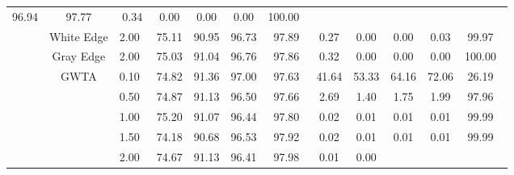 \begin{table}[htbp]
{\begin{tabular}{cc|c|ccccccccc}
  \multicolumn{1}{c|}{96.94} &
  \multicolumn{1}{c|}{97.77} &
  \multicolumn{1}{c|}{0.34} &
  \multicolumn{1}{c|}{0.00} &
  \multicolumn{1}{c|}{0.00} &
  \multicolumn{1}{c|}{0.00} &
  100.00\ \\ \cline{2-12} 
\multicolumn{1}{c|}{} &
  White Edge &
  2.00\ &
  \multicolumn{1}{c|}{75.11} &
  \multicolumn{1}{c|}{90.95} &
  \multicolumn{1}{c|}{96.73} &
  \multicolumn{1}{c|}{97.89} &
  \multicolumn{1}{c|}{0.27} &
  \multicolumn{1}{c|}{0.00} &
  \multicolumn{1}{c|}{0.00} &
  \multicolumn{1}{c|}{0.03} &
  99.97\ \\ \cline{2-12} 
\multicolumn{1}{c|}{} &
  Gray Edge &
  2.00\ &
  \multicolumn{1}{c|}{75.03} &
  \multicolumn{1}{c|}{91.04} &
  \multicolumn{1}{c|}{96.76} &
  \multicolumn{1}{c|}{97.86} &
  \multicolumn{1}{c|}{0.32} &
  \multicolumn{1}{c|}{0.00} &
  \multicolumn{1}{c|}{0.00} &
  \multicolumn{1}{c|}{0.00} &
  100.00\ \\ \cline{2-12} 
\multicolumn{1}{c|}{} &
  \multirow{9}{*}{GWTA}&
  0.10\ &
  \multicolumn{1}{c|}{74.82} &
  \multicolumn{1}{c|}{91.36} &
  \multicolumn{1}{c|}{97.00} &
  \multicolumn{1}{c|}{97.63} &
  \multicolumn{1}{c|}{41.64} &
  \multicolumn{1}{c|}{53.33} &
  \multicolumn{1}{c|}{64.16} &
  \multicolumn{1}{c|}{72.06} &
  26.19\ \\ \cline{3-12} 
\multicolumn{1}{c|}{} &
   &
  0.50\ &
  \multicolumn{1}{c|}{74.87} &
  \multicolumn{1}{c|}{91.13} &
  \multicolumn{1}{c|}{96.50} &
  \multicolumn{1}{c|}{97.66} &
  \multicolumn{1}{c|}{2.69} &
  \multicolumn{1}{c|}{1.40} &
  \multicolumn{1}{c|}{1.75} &
  \multicolumn{1}{c|}{1.99} &
  97.96\ \\ \cline{3-12} 
\multicolumn{1}{c|}{} &
   &
  1.00\ &
  \multicolumn{1}{c|}{75.20} &
  \multicolumn{1}{c|}{91.07} &
  \multicolumn{1}{c|}{96.44} &
  \multicolumn{1}{c|}{97.80} &
  \multicolumn{1}{c|}{0.02} &
  \multicolumn{1}{c|}{0.01} &
  \multicolumn{1}{c|}{0.01} &
  \multicolumn{1}{c|}{0.01} &
  99.99\ \\ \cline{3-12} 
\multicolumn{1}{c|}{} &
   &
  1.50\ &
  \multicolumn{1}{c|}{74.18} &
  \multicolumn{1}{c|}{90.68} &
  \multicolumn{1}{c|}{96.53} &
  \multicolumn{1}{c|}{97.92} &
  \multicolumn{1}{c|}{0.02} &
  \multicolumn{1}{c|}{0.01} &
  \multicolumn{1}{c|}{0.01} &
  \multicolumn{1}{c|}{0.01} &
  99.99\ \\ \cline{3-12} 
\multicolumn{1}{c|}{} &
   &
  2.00\ &
  \multicolumn{1}{c|}{74.67} &
  \multicolumn{1}{c|}{91.13} &
  \multicolumn{1}{c|}{96.41} &
  \multicolumn{1}{c|}{97.98} &
  \multicolumn{1}{c|}{0.01} &
  \multicolumn{1}{c|}{0.00} &

\end{tabular}}
\end{table}
